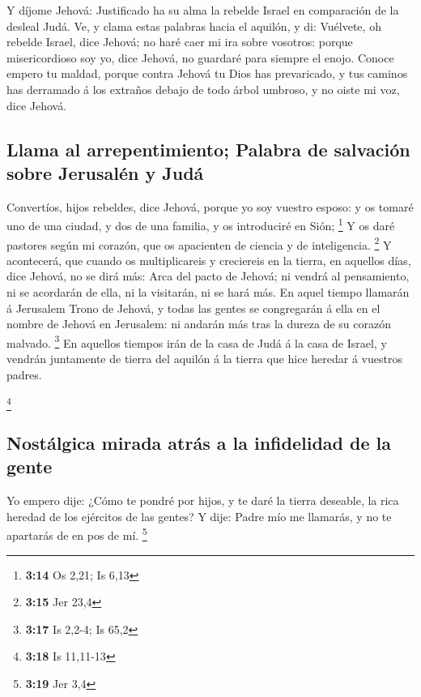  Y díjome Jehová: Justificado ha su alma la rebelde Israel
en comparación de la desleal Judá.  Ve, y clama estas
palabras hacia el aquilón, y di: Vuélvete, oh rebelde Israel, dice
Jehová; no haré caer mi ira sobre vosotros: porque misericordioso soy
yo, dice Jehová, no guardaré para siempre el enojo.  Conoce
empero tu maldad, porque contra Jehová tu Dios has prevaricado, y tus
caminos has derramado á los extraños debajo de todo árbol umbroso, y no
oiste mi voz, dice Jehová.

\hypertarget{llama-al-arrepentimiento-palabra-de-salvaciuxf3n-sobre-jerusaluxe9n-y-juduxe1}{%
\subsection{Llama al arrepentimiento; Palabra de salvación sobre
Jerusalén y
Judá}\label{llama-al-arrepentimiento-palabra-de-salvaciuxf3n-sobre-jerusaluxe9n-y-juduxe1}}

 Convertíos, hijos rebeldes, dice Jehová, porque yo soy
vuestro esposo: y os tomaré uno de una ciudad, y dos de una familia, y
os introduciré en Sión; \footnote{\textbf{3:14} Os 2,21; Is 6,13}
 Y os daré pastores según mi corazón, que os apacienten de
ciencia y de inteligencia. \footnote{\textbf{3:15} Jer 23,4}
 Y acontecerá, que cuando os multiplicareis y creciereis en
la tierra, en aquellos días, dice Jehová, no se dirá más: Arca del pacto
de Jehová; ni vendrá al pensamiento, ni se acordarán de ella, ni la
visitarán, ni se hará más.  En aquel tiempo llamarán á
Jerusalem Trono de Jehová, y todas las gentes se congregarán á ella en
el nombre de Jehová en Jerusalem: ni andarán más tras la dureza de su
corazón malvado. \footnote{\textbf{3:17} Is 2,2-4; Is 65,2}
 En aquellos tiempos irán de la casa de Judá á la casa de
Israel, y vendrán juntamente de tierra del aquilón á la tierra que hice
heredar á vuestros padres.

\footnote{\textbf{3:18} Is 11,11-13}

\hypertarget{nostuxe1lgica-mirada-atruxe1s-a-la-infidelidad-de-la-gente}{%
\subsection{Nostálgica mirada atrás a la infidelidad de la
gente}\label{nostuxe1lgica-mirada-atruxe1s-a-la-infidelidad-de-la-gente}}

 Yo empero dije: ¿Cómo te pondré por hijos, y te daré la
tierra deseable, la rica heredad de los ejércitos de las gentes? Y dije:
Padre mío me llamarás, y no te apartarás de en pos de mí. \footnote{\textbf{3:19}
  Jer 3,4}

